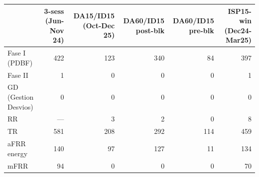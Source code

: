 \begin{tabular}{lrrrrr}
\toprule
 & 3-sess (Jun-Nov 24) & DA15/ID15 (Oct-Dec 25) & DA60/ID15 post-blk & DA60/ID15 pre-blk & ISP15-win (Dec24-Mar25) \\
\midrule
Fase I (PDBF) & 422 & 123 & 340 & 84 & 397 \\
Fase II & 1 & 0 & 0 & 0 & 1 \\
GD (Gestion Desvios) & 0 & 0 & 0 & 0 & 0 \\
RR & --- & 3 & 2 & 0 & 8 \\
TR & 581 & 208 & 292 & 114 & 459 \\
aFRR energy & 140 & 97 & 127 & 11 & 134 \\
mFRR & 94 & 0 & 0 & 0 & 70 \\
\bottomrule
\end{tabular}
